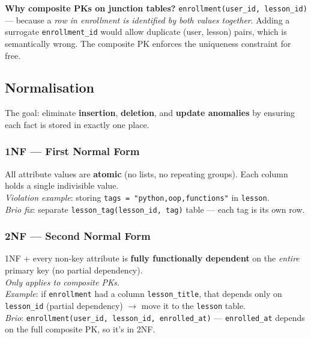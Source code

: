 \documentclass[11pt,a4paper]{article}
\newcommand{\T}[1]{\texttt{#1}}          %
\begin{document}
\begin{whybox}
\textbf{Why composite PKs on junction tables?} \T{enrollment(user\_id, lesson\_id)} —
because a \textit{row in enrollment is identified by both values together}. Adding a
surrogate \T{enrollment\_id} would allow duplicate (user, lesson) pairs, which is
semantically wrong. The composite PK enforces the uniqueness constraint for free.
\end{whybox}

\subsection{Normalisation}

The goal: eliminate \textbf{insertion}, \textbf{deletion}, and \textbf{update anomalies}
by ensuring each fact is stored in exactly one place.

\subsubsection{1NF — First Normal Form}
\begin{defbox}
All attribute values are \textbf{atomic} (no lists, no repeating groups). Each column
holds a single indivisible value.\\[4pt]
\textit{Violation example}: storing \T{tags = "python,oop,functions"} in \T{lesson}.\\
\textit{Brio fix}: separate \T{lesson\_tag(lesson\_id, tag)} table — each tag is its
own row.
\end{defbox}

\subsubsection{2NF — Second Normal Form}
\begin{defbox}
1NF + every non-key attribute is \textbf{fully functionally dependent} on the
\textit{entire} primary key (no partial dependency).\\[4pt]
\textit{Only applies to composite PKs.}\\
\textit{Example}: if \T{enrollment} had a column \T{lesson\_title}, that depends only
on \T{lesson\_id} (partial dependency) $\to$ move it to the \T{lesson} table.\\
\textit{Brio}: \T{enrollment(user\_id, lesson\_id, enrolled\_at)} — \T{enrolled\_at}
depends on the full composite PK, so it's in 2NF.
\end{defbox}
\end{document}
